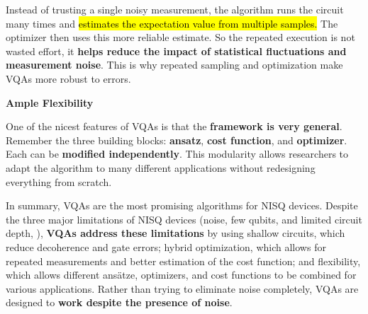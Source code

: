 \highspace
Instead of trusting a single noisy measurement, the algorithm runs the circuit many times and \hl{estimates the expectation value from multiple samples.} The optimizer then uses this more reliable estimate. So the repeated execution is not wasted effort, it \textbf{helps reduce the impact of statistical fluctuations and measurement noise}. This is why repeated sampling and optimization make VQAs more robust to errors.

\highspace
\begin{flushleft}
    \textcolor{Green3}{ \textbf{Ample Flexibility}}
\end{flushleft}
One of the nicest features of VQAs is that the \textbf{framework is very general}. Remember the three building blocks: \textbf{ansatz}, \textbf{cost function}, and \textbf{optimizer}. Each can be \textbf{modified independently}. This modularity allows researchers to adapt the algorithm to many different applications without redesigning everything from scratch.

\highspace
In summary, VQAs are the most promising algorithms for NISQ devices. Despite the three major limitations of NISQ devices (noise, few qubits, and limited circuit depth, ), \textbf{VQAs address these limitations} by using shallow circuits, which reduce decoherence and gate errors; hybrid optimization, which allows for repeated measurements and better estimation of the cost function; and flexibility, which allows different ansätze, optimizers, and cost functions to be combined for various applications. Rather than trying to eliminate noise completely, VQAs are designed to \textbf{work despite the presence of noise}.